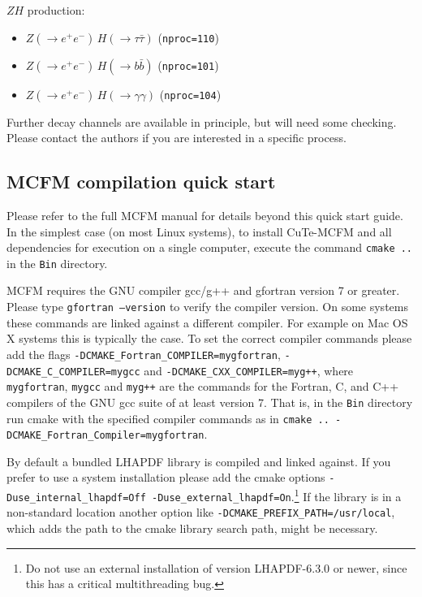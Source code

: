 \documentclass[
  11pt]{scrartcl}
\providecommand{\tightlist}{%
  \setlength{\itemsep}{0pt}\setlength{\parskip}{0pt}}
\begin{document}
\(ZH\) production:

\begin{itemize}
\tightlist
\item
  \(Z(\to e^+ e^-) \, H(\to \tau \bar\tau)\) (\texttt{nproc=110})
\item
  \(Z(\to e^+ e^-) \, H(\to b \bar b)\) (\texttt{nproc=101})
\item
  \(Z(\to e^+ e^-) \, H(\to \gamma \gamma)\) (\texttt{nproc=104})
\end{itemize}

Further decay channels are available in principle, but will need some
checking. Please contact the authors if you are interested in a specific process.

\hypertarget{mcfm-compilation-quick-start}{%
\subsection{MCFM compilation quick
start}\label{mcfm-compilation-quick-start}}

Please refer to the full MCFM manual for details beyond this quick start
guide. In the simplest case (on most Linux systems), to install CuTe-MCFM and
all dependencies for execution on a single computer, execute the command
\texttt{cmake ..} in the \texttt{Bin} directory.

MCFM requires the GNU compiler gcc/g++ and gfortran version 7 or greater.
Please type \texttt{gfortran --version} to verify the compiler version. On some systems
these commands are linked against a different compiler. For example on Mac OS X systems this is typically the case. To set the correct compiler commands please add the flags
\texttt{-DCMAKE\_Fortran\_COMPILER=mygfortran},
\texttt{-DCMAKE\_C\_COMPILER=mygcc} and
\texttt{-DCMAKE\_CXX\_COMPILER=myg++}, where \texttt{mygfortran},
\texttt{mygcc} and \texttt{myg++} are the commands for the Fortran, C,
and C++ compilers of the GNU gcc suite of at least version 7. That is,
in the \texttt{Bin} directory run cmake with the specified compiler commands as in
\texttt{cmake .. -DCMAKE\_Fortran\_Compiler=mygfortran}.


By default a bundled LHAPDF library is compiled and linked against. If you
prefer to use a system installation please add the cmake options
\texttt{-Duse\_internal\_lhapdf=Off -Duse\_external\_lhapdf=On}.\footnote{Do
not use an external installation of version LHAPDF-6.3.0 or newer, since this
has a critical multithreading bug.} If the library is in a non-standard
location another option like \texttt{-DCMAKE\_PREFIX\_PATH=/usr/local}, which
adds the path to the cmake library search path, might be necessary.
\end{document}
